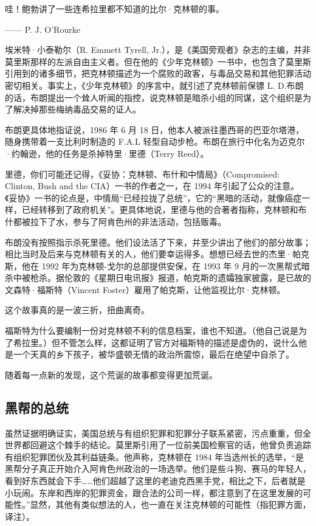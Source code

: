 \begin{tcolorbox}
哇！鲍勃讲了一些连希拉里都不知道的比尔·克林顿的事。
\begin{flushright}
—— P. J. O’Rourke
\end{flushright}
\end{tcolorbox}

埃米特·小泰勒尔（R. Emmett Tyrell, Jr.），是《美国旁观者》杂志的主编，并非莫里斯那样的左派自由主义者。但在他的《少年克林顿》一书中，也包含了莫里斯引用到的诸多细节，把克林顿描述为一个腐败的政客，与毒品交易和其他犯罪活动密切相关。事实上，《少年克林顿》的序言中，就引述了克林顿前保镖 L. D.布朗的话，布朗提出一个耸人听闻的指控，说克林顿是暗杀小组的同谋，这个组织是为了解决掉那些梅纳毒品交易的证人。

布朗更具体地指证说，1986 年 6 月 18 日，他本人被派往墨西哥的巴亚尔塔港，随身携带着一支比利时制造的 F.A.L 轻型自动步枪。布朗在旅行中化名为迈克尔·约翰逊，他的任务是杀掉特里·里德（Terry Reed）。

里德，你们可能还记得，《妥协：克林顿、布什和中情局》（Compromised: Clinton, Bush and the CIA）一书的作者之一，在 1994 年引起了公众的注意。《妥协》一书的论点是，中情局“已经拉拢了总统”，它的“黑暗的活动，就像癌症一样，已经转移到了政府机关”。更具体地说，里德与他的合著者指称，克林顿和布什都被拉下了水，参与了阿肯色州的非法活动，包括贩毒。

布朗没有按照指示杀死里德。他们设法活了下来，并至少讲出了他们的部分故事；相比当时及后来与克林顿有关的人，他们要幸运得多。想想已经去世的杰里·帕克斯，他在 1992 年为克林顿-戈尔的总部提供安保，在 1993 年 9 月的一次黑帮式暗杀中被枪杀。据伦敦的《星期日电讯报》报道，帕克斯的遗孀独家披露，是已故的文森特·福斯特（Vincent Foster）雇用了帕克斯，让他监视比尔·克林顿。

这个故事真的是一波三折，扭曲离奇。

福斯特为什么要编制一份对克林顿不利的信息档案，谁也不知道。（他自己说是为了希拉里。）但不管怎么样，这都证明了官方对福斯特的描述是虚伪的，说什么他是一个天真的乡下孩子，被华盛顿无情的政治所震惊，最后在绝望中自杀了。

随着每一点新的发现，这个荒诞的故事都变得更加荒诞。

\subsection{黑帮的总统}
虽然证据明确证实，美国总统与有组织犯罪和犯罪分子联系紧密，污点重重，但全世界都回避这个棘手的结论。莫里斯引用了一位前美国检察官的话，他曾负责追踪有组织犯罪团伙及其利益链条。他声称，克林顿在 1984 年当选州长的选举，“是黑帮分子真正开始介入阿肯色州政治的一场选举。他们是些斗狗、赛马的年轻人，看到好东西就会下手……他们超越了这里的老迪克西黑手党，相比之下，后者就是小玩闹。东岸和西岸的犯罪资金，跟合法的公司一样，都注意到了在这里发展的可能性。”显然，其他有类似想法的人，也一直在关注克林顿的可能性（指犯罪方面，译注）。

